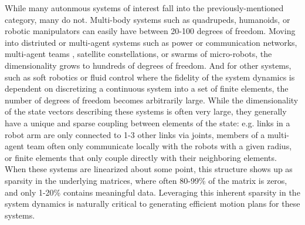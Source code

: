 \documentclass[conference]{IEEEtran}
\begin{document}
While many autonmous systems of interest fall into the previously-mentioned category, many
do not. Multi-body systems such as quadrupeds, humanoids, or robotic manipulators can easily
have between 20-100 degrees of freedom. Moving into distriuted or multi-agent systems such
as power or communication networks, multi-agent teams \cite{jackson_Scalable_2020}, 
satellite constellations, or swarms 
of micro-robots, the dimensionality grows to hundreds of degrees of freedom. And for other
systems, such as soft robotics or fluid control where the fidelity of the system dynamics is
dependent on discretizing a continuous system into a set of finite elements, the number of 
degrees of freedom becomes arbitrarily large. While the dimensionality of the state vectors
describing these systems is often very large, they generally have a unique and sparse coupling
between elements of the state: e.g. links in a robot arm are only connected to 1-3 other 
links via joints, members of a multi-agent team often only communicate locally with the 
robots with a given radius, or finite elements that only couple directly with their 
neighboring elements. When these systems are linearized about some point, this structure 
shows up as sparsity in the underlying matrices, where often 80-99\% of the matrix is zeros,
and only 1-20\% contains meaningful data. Leveraging this inherent sparsity in the system 
dynamics is naturally critical to generating efficient motion plans for these systems.
\end{document}
